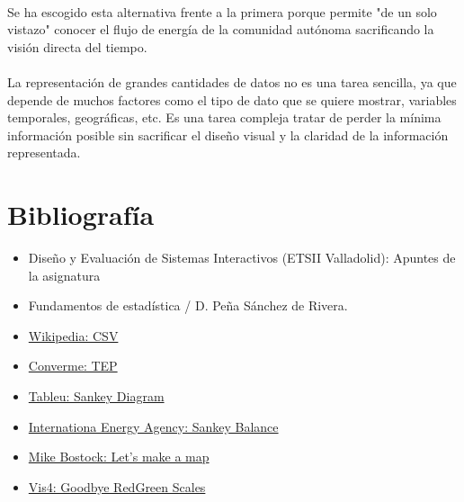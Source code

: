 \documentclass[11pt,spanish]{article}
\begin{document}
			\paragraph{}
			Se ha escogido esta alternativa frente a la primera porque permite "de un solo vistazo" conocer el flujo de energía de la comunidad autónoma sacrificando la visión directa del tiempo.

			\paragraph{}
			La representación de grandes cantidades de datos no es una tarea sencilla, ya que depende de muchos factores como el tipo de dato que se quiere mostrar, variables temporales, geográficas, etc. Es una tarea compleja tratar de perder la mínima información posible sin sacrificar el diseño visual y la claridad de la información representada.
			
\newpage

	\section{Bibliografía}

		\begin{itemize}
			
			\item	Diseño y Evaluación de Sistemas Interactivos (ETSII Valladolid): Apuntes de la asignatura
					
			\item	Fundamentos de estadística / D. Peña Sánchez de Rivera.
		
			\item \href{https://en.wikipedia.org/wiki/Comma-separated_values}{Wikipedia: CSV}
			
			\item \href{http://www.convert-me.com/es/convert/energy/toe.html}{Converme: TEP}
			
			\item \href{https://community.tableau.com/thread/152115}{Tableu: Sankey Diagram}

			\item \href{http://www.iea.org/Sankey/index.html}{Internationa Energy Agency: Sankey Balance}

			\item \href{http://bost.ocks.org/mike/map/}{Mike Bostock: Let's make a map}

			\item \href{https://vis4.net/blog/posts/goodbye-redgreen-scales/}{Vis4: Goodbye RedGreen Scales}
		
		\end{itemize}
\end{document}
